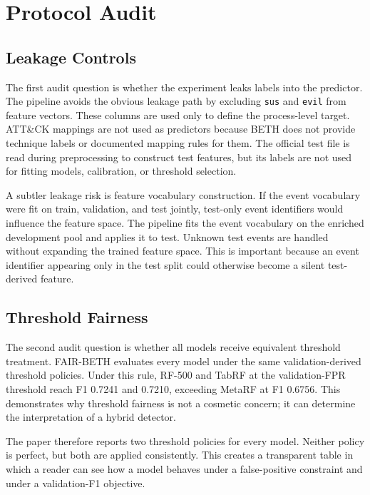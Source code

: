 \documentclass[journal]{IEEEtran}
\begin{document}
\section{Protocol Audit}
\label{sec:audit}

\subsection{Leakage Controls}

The first audit question is whether the experiment leaks labels into the predictor. The pipeline avoids the obvious leakage path by excluding \texttt{sus} and \texttt{evil} from feature vectors. These columns are used only to define the process-level target. ATT\&CK mappings are not used as predictors because BETH does not provide technique labels or documented mapping rules for them. The official test file is read during preprocessing to construct test features, but its labels are not used for fitting models, calibration, or threshold selection.

A subtler leakage risk is feature vocabulary construction. If the event vocabulary were fit on train, validation, and test jointly, test-only event identifiers would influence the feature space. The pipeline fits the event vocabulary on the enriched development pool and applies it to test. Unknown test events are handled without expanding the trained feature space. This is important because an event identifier appearing only in the test split could otherwise become a silent test-derived feature.

\subsection{Threshold Fairness}

The second audit question is whether all models receive equivalent threshold treatment. FAIR-BETH evaluates every model under the same validation-derived threshold policies. Under this rule, RF-500 and TabRF at the validation-FPR threshold reach F1 0.7241 and 0.7210, exceeding MetaRF at F1 0.6756. This demonstrates why threshold fairness is not a cosmetic concern; it can determine the interpretation of a hybrid detector.

The paper therefore reports two threshold policies for every model. Neither policy is perfect, but both are applied consistently. This creates a transparent table in which a reader can see how a model behaves under a false-positive constraint and under a validation-F1 objective.
\end{document}
